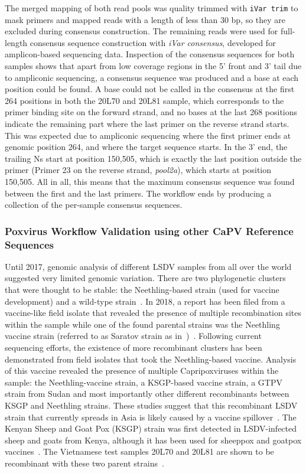 The merged mapping of both read pools was quality trimmed with \texttt{iVar trim} to mask primers and mapped reads with a length of less than 30 bp, so they are excluded during consensus construction. The remaining reads were used for full-length consensus sequence construction with \textit{iVar consensus}, developed for amplicon-based sequencing data. Inspection of the consensus sequences for both samples shows that apart from low coverage regions in the 5' front and 3' tail due to ampliconic sequencing, a consensus sequence was produced and a base at each position could be found. A base could not be called in the consensus at the first 264 positions in both the 20L70 and 20L81 sample, which corresponds to the primer binding site on the forward strand, and no bases at the last 268 positions indicate the remaining part where the last primer on the reverse strand starts. This was expected due to ampliconic sequencing where the first primer ends at genomic position 264, and where the target sequence starts. In the 3' end, the trailing Ns start at position 150,505, which is exactly the last position outside the primer (Primer 23 on the reverse strand, \textit{pool2a}), which starts at position 150,505. All in all, this means that the maximum consensus sequence was found between the first and the last primers. The workflow ends by producing a collection of the per-sample consensus sequences.

\subsubsection*{Poxvirus Workflow Validation using other CaPV Reference Sequences}
Until 2017, genomic analysis of different \ac{LSDV} samples from all over the world suggested very limited genomic variation. There are two phylogenetic clusters that were thought to be stable: the Neethling-based strain (used for vaccine development) and a wild-type strain~\cite{biswas2020extended}. In 2018, a report has been filed from a vaccine-like field isolate that revealed the presence of multiple recombination sites within the sample while one of the found parental strains was the Neethling vaccine strain (referred to as Saratov strain as in~)~\cite{sprygin2018analysis}. Following current sequencing efforts, the existence of more recombinant clusters has been demonstrated from field isolates that took the Neethling-based vaccine. Analysis of this vaccine revealed the presence of multiple Capripoxviruses within the sample: the Neethling-vaccine strain, a KSGP-based vaccine strain, a \ac{GTPV} strain from Sudan and most importantly other different recombinants between KSGP and Neethling strains. These studies suggest that this recombinant \ac{LSDV} strain that currently spreads in Asia is likely caused by a vaccine spillover~\cite{vandenbussche2022recombinant}. The Kenyan Sheep and Goat Pox (KSGP) strain was first detected in \ac{LSDV}-infected sheep and goats from Kenya, although it has been used for sheeppox and goatpox vaccines~\cite{tuppurainen2014characterization}. The Vietnamese test samples 20L70 and 20L81 are shown to be recombinant with these two parent strains~\cite{vandenbussche2022recombinant}.

